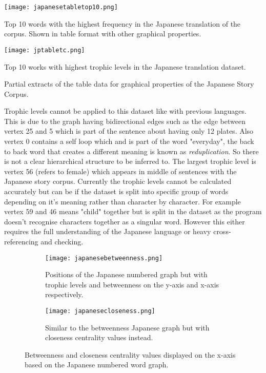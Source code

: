 \begin{table}[H]
\centering
\begin{subtable}{.45\textwidth}
	\texttt{[image: japanesetabletop10.png]}
	\caption{Top 10 words with the highest frequency in the Japanese translation of the corpus. Shown in table format with other graphical properties. }
	\label{table:japanesetop}
\end{subtable}
\hfill
\begin{subtable}{.45\textwidth}
	\hspace{1.5cm} 
	\texttt{[image: jptabletc.png]}
	\caption{Top 10 works with highest trophic levels in the Japanese translation dataset.}
	\label{table:japanesentoptc}
\end{subtable}
\caption{Partial extracts of the table data for graphical properties of the Japanese Story Corpus.}
\end{table}

Trophic levels cannot be applied to this dataset like with previous languages. This is due to the graph having bidirectional edges such as the edge between vertex 25 and 5 which is part of the sentence about having only 12 plates. Also vertex 0 contains a self loop which and is part of the word "everyday", the back to back word that creates a different meaning is known as \emph{reduplication}. So there is not a clear hierarchical structure to be inferred to. The largest trophic level is vertex 56 (refers to female) which appears in middle of sentences with the Japanese story corpus. Currently the trophic levels cannot be calculated accurately but can be if the dataset is split into specific group of words depending on it's meaning rather than character by character. For example vertex 59 and 46 means "child" together but is split in the dataset as the program doesn't recognise characters together as a singular word. However this either requires the full understanding of the Japanese language or heavy cross-referencing and checking. 

\begin{figure}[H]
\centering
\begin{subfigure}{.45\textwidth}
	\hspace{-1cm} 
	\texttt{[image: japanesebetweenness.png]}
	\caption{Positions of the Japanese numbered graph but with trophic levels and betweenness on the y-axis and x-axis respectively.}
	\label{fig:jpbc}
\end{subfigure}
\hfill
\begin{subfigure}{.45\textwidth}
	\hspace{-1cm} 
	\texttt{[image: japanesecloseness.png]}
	\caption{Similar to the betweenness Japanese graph but with closeness centrality values instead. }
	\label{fig:jpcc}
\end{subfigure}
\caption{Betweenness and closeness centrality values displayed on the x-axis based on the Japanese numbered word graph.}
\label{fig:jpcentrality}
\end{figure}

